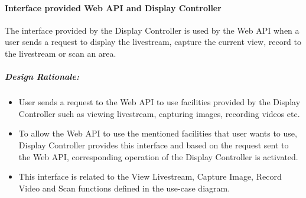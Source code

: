 	\paragraph{Interface provided Web API and Display Controller}
	The interface provided by the Display Controller is used by the Web API when a user sends a request to display the livestream, capture the current view, record to the livestream or scan an area.
	\subparagraph{Design Rationale:}
	\begin{itemize}
		\item User sends a request to the Web API to use facilities provided by the Display Controller such as viewing livestream, capturing images, recording videos etc.
		\item To allow the Web API to use the mentioned facilities that user wants to use, Display Controller provides this interface and based on the request sent to the Web API, corresponding operation of the Display Controller is activated.
		\item This interface is related to the View Livestream, Capture Image, Record Video and Scan functions defined in the use-case diagram.
	\end{itemize}

